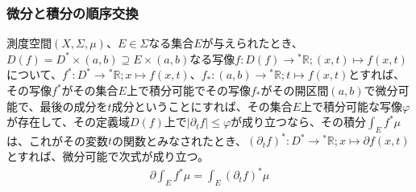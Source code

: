 \documentclass[dvipdfmx]{jsarticle}
\begin{document}
\subsubsection{微分と積分の順序交換}%
\begin{thm}\label{4.6.2.13}
測度空間$(X,\varSigma,\mu)$、$E \in \varSigma$なる集合$E$が与えられたとき、$D(f) = D^{*} \times (a,b) \supseteq E \times (a,b)$なる写像$f:D(f) \rightarrow{}^{*}\mathbb{R};(x,t) \mapsto f(x,t)$について、$f^{*}:D^{*} \rightarrow{}^{*}\mathbb{R};x \mapsto f(x,t)$、$f_{*}:(a,b) \rightarrow{}^{*}\mathbb{R};t \mapsto f(x,t)$とすれば、その写像$f^{*}$がその集合$E$上で積分可能でその写像$f_{*}$がその開区間$(a,b)$で微分可能で、最後の成分を$t$成分ということにすれば、その集合$E$上で積分可能な写像$\varphi$が存在して、その定義域$D(f)$上で$\left| \partial_{t}f \right| \leq \varphi$が成り立つなら、その積分$\int_{E} {f^{*}\mu}$は、これがその変数$t$の関数とみなされたとき、$\left( \partial_{t}f \right)^{*}:D^{*} \rightarrow{}^{*}\mathbb{R};x \mapsto \partial f(x,t)$とすれば、微分可能で次式が成り立つ。
\begin{align*}
\partial\int_{E} {f^{*}\mu} = \int_{E} {\left( \partial_{t}f \right)^{*}\mu}
\end{align*}
\end{thm}
\end{document}
